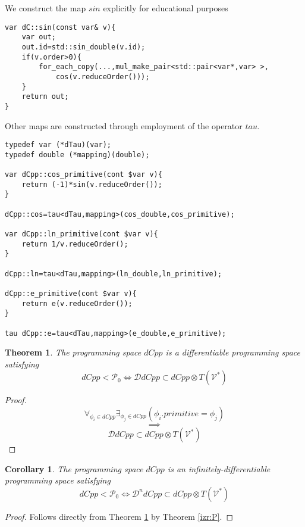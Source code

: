 \documentclass{article}
\newcommand{\VV}{\mathcal{V}}
\newcommand{\dP}{\mathcal{P}}
\newcommand{\DD}{\mathcal{D}}
\newtheorem{izrek}{Theorem}[section]
\newtheorem{corollary}{Corollary}[section]
\begin{document}
We construct the map $sin$ explicitly for educational purposes

\begin{lstlisting}
var dC::sin(const var& v){
    var out;
    out.id=std::sin_double(v.id);
    if(v.order>0){
    	for_each_copy(...,mul_make_pair<std::pair<var*,var> >,
    		cos(v.reduceOrder()));
    }
    return out;
}
\end{lstlisting}

Other maps are constructed through employment of the operator $tau$.


\begin{lstlisting}
typedef var (*dTau)(var);
typedef double (*mapping)(double);

var dCpp::cos_primitive(cont $var v){
	return (-1)*sin(v.reduceOrder());
}

dCpp::cos=tau<dTau,mapping>(cos_double,cos_primitive);

var dCpp::ln_primitive(cont $var v){
	return 1/v.reduceOrder();
}

dCpp::ln=tau<dTau,mapping>(ln_double,ln_primitive);

dCpp::e_primitive(cont $var v){
	return e(v.reduceOrder());
}

tau dCpp::e=tau<dTau,mapping>(e_double,e_primitive);

\end{lstlisting}

\begin{izrek}\label{izr:dCpp}
The programming space $dCpp$ is a differentiable programming space satisfying
\begin{equation}
dCpp<\dP_0\iff \DD dCpp\subset dCpp\otimes T(\VV^*)
\end{equation}
\end{izrek}
\begin{proof}
\begin{equation}
\forall_{\phi_i\in dCpp}\exists_{\phi_j\in dCpp}(\phi_i.primitive=\phi_j)
\end{equation}
$$\implies$$
\begin{equation}
\DD dCpp\subset dCpp\otimes T(\VV^*)
\end{equation}
\end{proof}
\begin{corollary}
The programming space $dCpp$ is an infinitely-differentiable programming space satisfying
\begin{equation}
dCpp<\dP_0\iff \DD^n dCpp\subset dCpp\otimes T(\VV^*)
\end{equation}
\end{corollary}
\begin{proof}
Follows directly from Theorem \ref{izr:dCpp} by Theorem \ref{izr:P}.
\end{proof}
\end{document}
